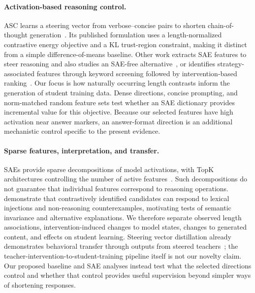 \paragraph{Activation-based reasoning control.}
ASC learns a steering vector from verbose--concise pairs to shorten chain-of-thought generation~\citep{azizi2026activation}.
Its published formulation uses a length-normalized contrastive energy objective and a KL trust-region constraint, making it distinct from a simple difference-of-means baseline.
Other work extracts SAE features to steer reasoning and also studies an SAE-free alternative~\citep{li2025feature}, or identifies strategy-associated features through keyword screening followed by intervention-based ranking~\citep{fang2026controllable}.
Our focus is how naturally occurring length contrasts inform the generation of student training data.
Dense directions, concise prompting, and norm-matched random feature sets test whether an SAE dictionary provides incremental value for this objective.
Because our selected features have high activation near answer markers, an answer-format direction is an additional mechanistic control specific to the present evidence.

\paragraph{Sparse features, interpretation, and transfer.}
SAEs provide sparse decompositions of model activations, with TopK architectures controlling the number of active features~\citep{cunningham2023sparse,gao2024scaling}.
Such decompositions do not guarantee that individual features correspond to reasoning operations.
\citet{ma2026reasoning} demonstrate that contrastively identified candidates can respond to lexical injections and non-reasoning counterexamples, motivating tests of semantic invariance and alternative explanations.
We therefore separate observed length associations, intervention-induced changes to model states, changes to generated content, and effects on student learning.
Steering vector distillation already demonstrates behavioral transfer through outputs from steered teachers~\citep{blank2026subliminal}; the teacher-intervention-to-student-training pipeline itself is not our novelty claim.
Our proposed baseline and SAE analyses instead test what the selected directions control and whether that control provides useful supervision beyond simpler ways of shortening responses.
